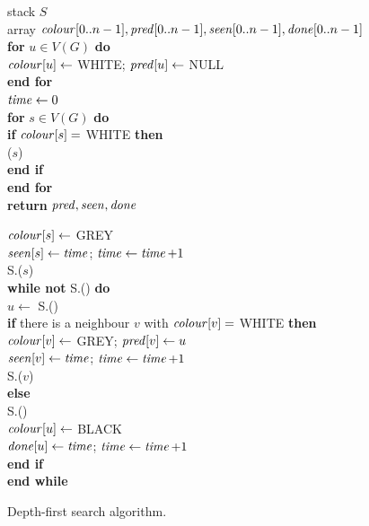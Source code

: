 \begin{figure}[htbp]
\hspace*{.3in}\begin{minipage}{5in}
{
\> stack $S$ \\ 
\> array $\colour[0..n-1], \pred[0..n-1], \seen[0..n-1], \done[0..n-1]$ \\
\> \textbf{for} $u \in V(G)$ \textbf{do} \\
\> \> $\colour[u] \gets $ WHITE; $\pred[u] \gets $ NULL \\
\> \textbf{end for}\\
\> $\timeVar \gets 0$ \\
\> \textbf{for}  $s\in V(G)$ \textbf{do} \\
\> \> \textbf{if} $\colour[s] = $ WHITE \textbf{then} \\
\> \> \> ($s$) \\
\> \> \textbf{end if}\\
\> \textbf{end for}\\
\> \textbf{return} $\pred, \seen, \done$ \\
}

{
\> $\colour[s] \gets $ GREY \\
\> $\seen[s] \gets \timeVar$; $\timeVar \gets \timeVar + 1$ \\
\> S.($s$) \\
\> \textbf{while not} S.() \textbf{do} \\
\> \> $u \gets $ S.() \\
\> \>  \textbf{if} there is a neighbour $v$ with $\colour[v] = $ WHITE \textbf{then} \\
\> \> \> $\colour[v] \gets $ GREY; $\pred[v] \gets u$ \\ 
\> \> \> $\seen[v] \gets \timeVar$; $\timeVar \gets \timeVar + 1$ \\
\> \> \> S.($v$) \\
\> \> \textbf{else} \\
\> \> \> S.() \\
\> \> \> $\colour[u] \gets $ BLACK \\
\> \> \> $\done[u] \gets \timeVar$; $\timeVar \gets \timeVar + 1$ \\
\> \> \textbf{end if} \\
\> \textbf{end while} \\
}
\end{minipage}
\caption{Depth-first search algorithm.}
\label{fig:DFScode}
\end{figure}

